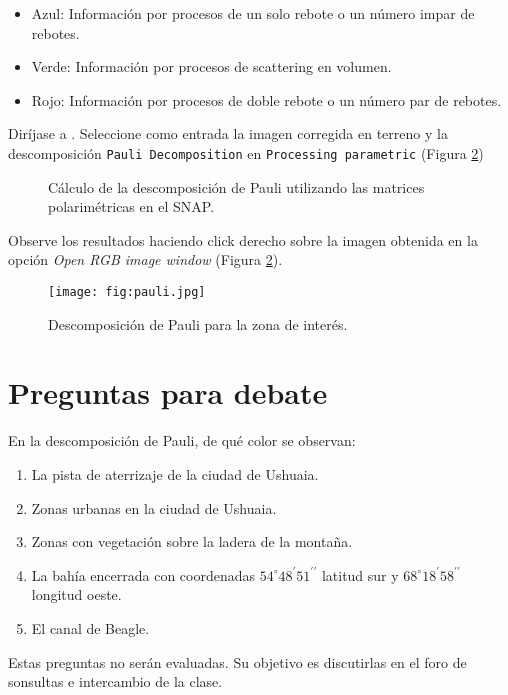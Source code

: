 \begin{itemize}
    \item Azul: Información por procesos de un solo rebote o un número impar de rebotes.
    \item Verde: Información por procesos de scattering en volumen.
    \item Rojo: Información por procesos de doble rebote o un número par de rebotes.
\end{itemize}

Diríjase a . Seleccione como entrada la imagen corregida en terreno y la descomposición \texttt{Pauli Decomposition} en \texttt{Processing parametric} (Figura \ref{fig:pauli})

\begin{figure}[h!]
    \centering
    \hspace{1cm}
    \caption{Cálculo de la descomposición de Pauli utilizando las matrices polarimétricas en el SNAP.}
    \label{fig:pauli}
\end{figure}

Observe los resultados haciendo click derecho sobre la imagen obtenida en la opción \emph{Open RGB image window} (Figura \ref{fig:pauli}).

\begin{figure}[h!]
    \centering
    \texttt{[image: fig:pauli.jpg]}
    \caption{Descomposición de Pauli para la zona de interés.}
    \label{fig:pauli}
\end{figure}


\section{Preguntas para debate}

\begin{que}
    En la descomposición de Pauli, de qué color  se observan:
    \begin{enumerate}
        \item La pista de aterrizaje de la ciudad de Ushuaia.
        \item Zonas urbanas en la ciudad de Ushuaia.
        \item Zonas con vegetación sobre la ladera de la montaña.
        \item La bahía encerrada con coordenadas $54^\circ 48^\prime 51^{\prime\prime}$ latitud sur y $68^\circ 18^\prime 58^{\prime\prime}$ longitud oeste.
        \item El canal de Beagle.
    \end{enumerate}
\end{que}

Estas preguntas no serán evaluadas. Su objetivo es discutirlas en el foro de sonsultas e intercambio de la clase.
